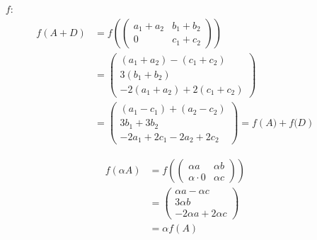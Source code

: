 \documentclass{../mfa}
\begin{document}
\maketitle
\renewcommand{\v}[1]{\mbf{v}_{#1}}
\section{}
\subsection{}
\begin{itemize}
   \item[$f$:] \begin{align*}
         f\left(A+D\right) &= f\left(\begin{pmatrix} a_1 + a_2 & b_1 + b_2 \\ 0 & c_1 + c_2
   \end{pmatrix}\right) \\
   &= \begin{pmatrix}
   (a_1 + a_2) - (c_1 + c_2) \\
   3(b_1 + b_2) \\
   -2(a_1 + a_2) + 2(c_1 + c_2)
\end{pmatrix} \\
&= \begin{pmatrix}
(a_1 - c_1) + (a_2 - c_2) \\
3b_1 + 3b_2 \\
-2a_1 + 2c_1 - 2a_2 + 2c_2
\end{pmatrix} = f\left(A) + f(D\right)
\end{align*}

\begin{align*}
         f\left(\alpha A\right) &= f\left(\begin{pmatrix} \alpha a & \alpha b\\ \alpha \cdot 0 & \alpha c
   \end{pmatrix}\right) \\
   &= \begin{pmatrix}
   \alpha a - \alpha c \\
   3\alpha b \\
   -2\alpha a + 2\alpha c
\end{pmatrix} \\
&= \alpha f(A)
\end{align*}


\end{itemize}
\end{document}
